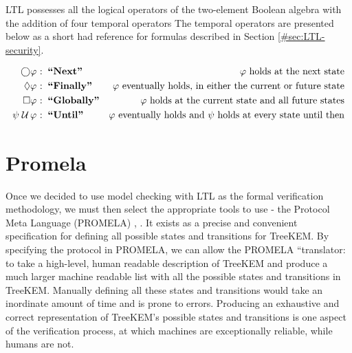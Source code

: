 LTL possesses all the logical operators of the two-element Boolean algebra with the addition of four temporal operators
The temporal operators are presented below as a short had reference for formulas described in Section \ref{#sec:LTL-security}.

\[
\begin{aligned}[t]
                 \bigcirc & \varphi & \!\!\!\!\textrm{:} & \;\;\textbf{``Next''}     & \varphi\textrm{ holds at the next state} \hfill &\\
                 \Diamond & \varphi & \!\!\!\!\textrm{:} & \;\;\textbf{``Finally''}  & \varphi\textrm{ eventually holds, in either the current or future state} \hfill &\\
                 \Box     & \varphi & \!\!\!\!\textrm{:} & \;\;\textbf{``Globally''} & \varphi\textrm{ holds at the current state and all future states} \hfill &\\
  \psi \;{\mathcal {U}}\, & \varphi & \!\!\!\!\textrm{:} & \;\;\textbf{``Until''}    & \varphi\textrm{ eventually holds and $\psi$ holds at every state until then} \hfill &\\
\end{aligned}
\]

\hypertarget{promela}{%
\section{Promela}\label{promela}}

Once we decided to use model checking with LTL as the formal verification methodology, we must then select the appropriate tools to use - the Protocol Meta Language (PROMELA) \autocite{holzmann1980basic}, \autocite{holzmann1990design}.
It exists as a precise and convenient specification for defining all possible states and transitions for TreeKEM.
By specifying the protocol in PROMELA, we can allow the PROMELA ``translator: to take a high-level, human readable description of TreeKEM and produce a much larger machine readable list with all the possible states and transitions in TreeKEM.
Manually defining all these states and transitions would take an inordinate amount of time and is prone to errors.
Producing an exhaustive and correct representation of TreeKEM's possible states and transitions is one aspect of the verification process, at which machines are exceptionally reliable, while humans are not.

